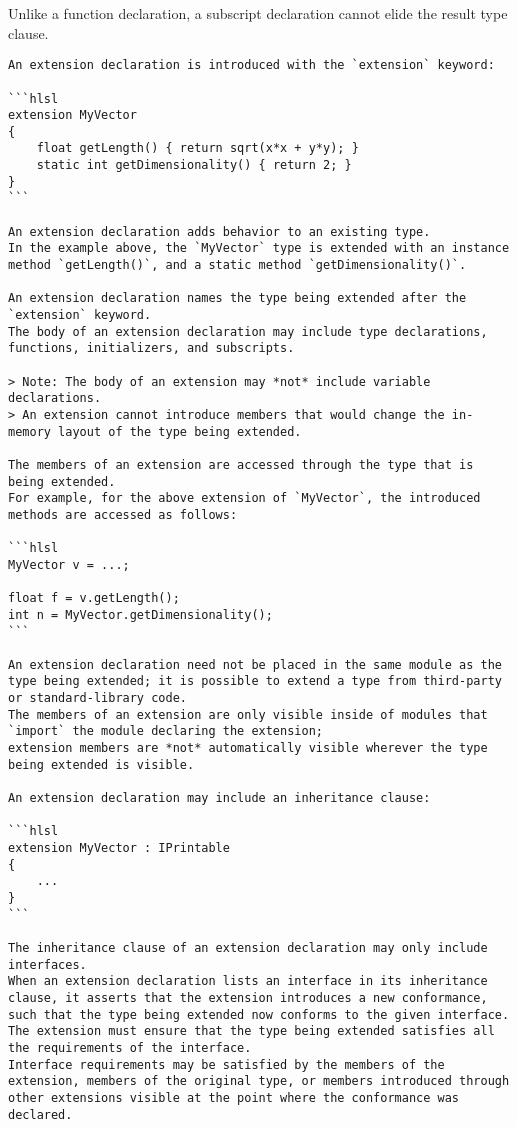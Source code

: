 \begin{Note}
Unlike a function declaration, a subscript declaration cannot elide the result type clause.
\end{Note}


\begin{verbatim}
An extension declaration is introduced with the `extension` keyword:

```hlsl
extension MyVector
{
    float getLength() { return sqrt(x*x + y*y); }
    static int getDimensionality() { return 2; }
}
```

An extension declaration adds behavior to an existing type.
In the example above, the `MyVector` type is extended with an instance method `getLength()`, and a static method `getDimensionality()`.

An extension declaration names the type being extended after the `extension` keyword.
The body of an extension declaration may include type declarations, functions, initializers, and subscripts.

> Note: The body of an extension may *not* include variable declarations.
> An extension cannot introduce members that would change the in-memory layout of the type being extended.

The members of an extension are accessed through the type that is being extended.
For example, for the above extension of `MyVector`, the introduced methods are accessed as follows:

```hlsl
MyVector v = ...;

float f = v.getLength();
int n = MyVector.getDimensionality();
```

An extension declaration need not be placed in the same module as the type being extended; it is possible to extend a type from third-party or standard-library code.
The members of an extension are only visible inside of modules that `import` the module declaring the extension;
extension members are *not* automatically visible wherever the type being extended is visible.

An extension declaration may include an inheritance clause:

```hlsl
extension MyVector : IPrintable
{
    ...
}
```

The inheritance clause of an extension declaration may only include interfaces.
When an extension declaration lists an interface in its inheritance clause, it asserts that the extension introduces a new conformance, such that the type being extended now conforms to the given interface.
The extension must ensure that the type being extended satisfies all the requirements of the interface.
Interface requirements may be satisfied by the members of the extension, members of the original type, or members introduced through other extensions visible at the point where the conformance was declared.


\end{verbatim}
